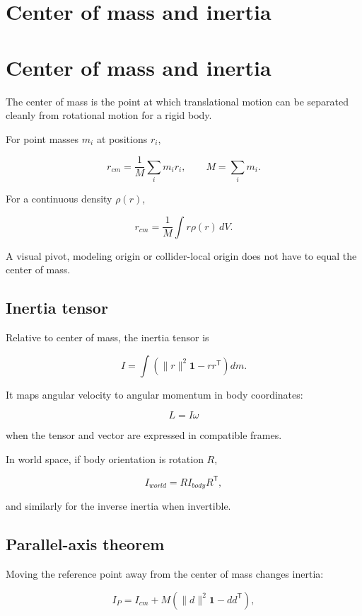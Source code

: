 \hypertarget{appendix-66742099f8a0}{}
\section*{Center of mass and inertia}
\section{Center of mass and inertia}\label{center-of-mass-and-inertia}

The center of mass is the point at which translational motion can be separated cleanly from rotational motion for a rigid body.

For point masses \(m_i\) at positions \(r_i\),

\[
r_{cm}=\frac{1}{M}\sum_i m_i r_i,
\qquad
M=\sum_i m_i.
\]

For a continuous density \(\rho(r)\),

\[
r_{cm}=\frac{1}{M}\int r\rho(r)\,dV.
\]

A visual pivot, modeling origin or collider-local origin does not have to equal the center of mass.

\subsection{Inertia tensor}\label{inertia-tensor}

Relative to center of mass, the inertia tensor is

\[
I=
\int
\left(
\|r\|^2\mathbf{1}-rr^{\mathsf T}
\right)dm.
\]

It maps angular velocity to angular momentum in body coordinates:

\[
L=I\omega
\]

when the tensor and vector are expressed in compatible frames.

In world space, if body orientation is rotation \(R\),

\[
I_{world}=RI_{body}R^{\mathsf T},
\]

and similarly for the inverse inertia when invertible.

\subsection{Parallel-axis theorem}\label{parallel-axis-theorem}

Moving the reference point away from the center of mass changes inertia:

\[
I_P=
I_{cm}
+
M\left(
\|d\|^2\mathbf{1}-dd^{\mathsf T}
\right),
\]

